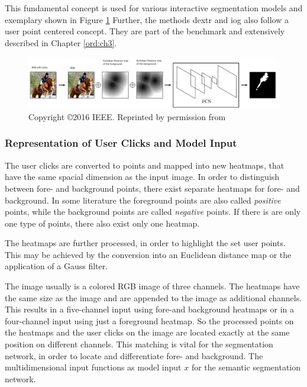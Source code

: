 This fundamental concept is used for various interactive segmentation models \cite{Xu16-InteractiveObjectSelection} \cite{MVL18-ITIS} and exemplary shown in Figure \ref{fig:ch2:sec3:ifcn}
Further, the methods \gls{dextr}  \cite{Man18-DEXTR} and \gls{iog} \cite{Zha20-IOG} also follow a user point centered concept. They are part of the benchmark and extensively described in Chapter \ref{ord:ch3}.
\begin{figure}
	\includegraphics[width=\linewidth]{figures/chap232_ifcn.png}
	\caption[Interactively Fully Convolutional Network]{ Copyright \copyright 2016 IEEE. Reprinted by permission from \cite{Xu16-InteractiveObjectSelection}}
	\label{fig:ch2:sec3:ifcn}
\end{figure}

\subsubsection{Representation of User Clicks and Model Input}
The user clicks are converted to points and mapped into new heatmaps, that have the same spacial dimension as the input image.
In order to distinguish between fore- and background points, there exist separate heatmaps for fore- and background.
In some literature the foreground points are also called \textit{positive} points, while the background points are called \textit{negative} points.
If there is are only one type of points, there also exist only one heatmap.

The heatmaps are further processed, in order to highlight the set user points.
This may be achieved by the conversion into an Euclidean distance map \cite{Dan80-EuclideanDistanceMapping} or the application of a Gauss filter.

The image usually is a colored RGB image of three channels.
The heatmaps have the same size as the image and are appended to the image as additional channels.
This results in a five-channel input using fore-and background heatmaps or in a four-channel input using just a foreground heatmap.
So the processed points on the heatmaps and the user clicks on the image are located exactly at the same position on different channels.
This matching is vital for the segmentation network, in order to locate and differentiate fore- and background.
The multidimensional input functions as model input $x$ for the semantic segmentation network.

